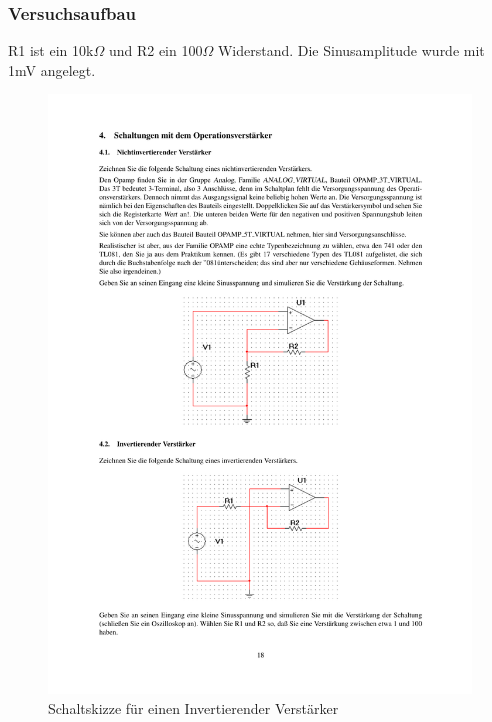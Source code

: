 \documentclass[12pt,a4paper]{article}
\begin{document}
\subsubsection{Versuchsaufbau}

R1 ist ein 10k$\Omega$ und R2 ein 100$\Omega$ Widerstand. Die Sinusamplitude wurde mit 1mV angelegt.

\begin{figure}[H] 
  \centering
    \includegraphics[trim = 10mm 45mm 10mm 190mm, clip, scale = 1]{ep5_14[Page18].pdf}
  	\caption[Schaltskizze für einen Invertierender Verstärker]{Schaltskizze für einen Invertierender Verstärker\footnotemark}
  \label{fig:4_a_2}
\end{figure}
\end{document}
